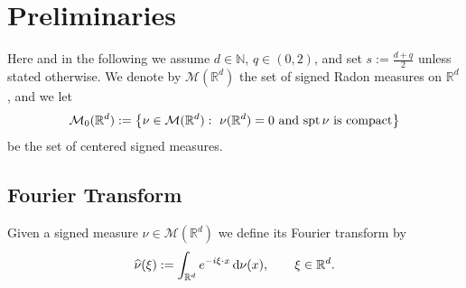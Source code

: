 \documentclass[12pt,a4paper,oneside]{amsart}
\theoremstyle{plain}
\theoremstyle{definition}
\numberwithin{equation}{section}
\numberwithin{figure}{section}
\numberwithin{table}{section}
\theoremstyle{remark}
\newcommand{\R}{\mathbb{R}}
\newcommand{\E}{\mathbb{E}}
\newcommand{\dd}{\textup{d}}
\newcommand{\calM}{\mathcal{M}}
\newcommand{\N}{\mathbb{N}}
\newcommand{\Fhat}[1]{\widehat{#1}}
\newcommand{\expAhlfors}{\beta}
\begin{document}



\section{Preliminaries}\label{sec:preliminaries}
Here and in the following we assume $d\in \N$, $q\in (0,2)$, and set $s:=\frac{d+q}{2}$ unless stated otherwise. We denote by $\mathcal{M} (\mathbb{R}^d)$ the set of signed Radon measures on $\mathbb{R}^d$, and we let
\begin{equation*}
\calM_0(\R^d):=\bigl\{\nu\in\calM(\R^d):\ \nu(\R^d)=0 \textup{ and  $\mathrm{spt}\,\nu$ is compact} \bigr\}
\end{equation*}
be the set of centered signed measures.

\subsection{Fourier Transform}
Given a signed measure $\nu\in\calM(\R^d)$ we define its Fourier transform by
\begin{equation}\label{eq:FT-measure}
\Fhat{\nu}(\xi):=\int_{\R^d} e^{-i\xi\cdot x}\,\dd\nu(x),\qquad \xi\in\R^d.
\end{equation}
\end{document}
